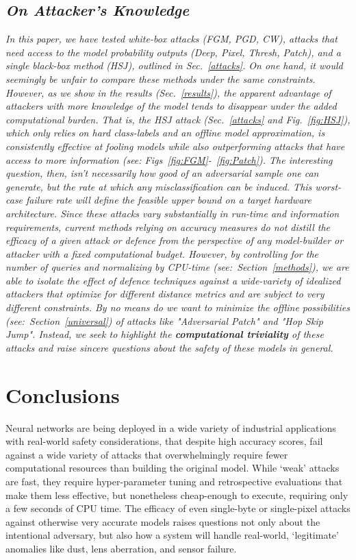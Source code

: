 \documentclass[journal]{IEEEtran}
\newcommand{\cm}[1]{\textit{{\color{blue}#1}}}
\begin{document}
\subsection{\cm{On Attacker's Knowledge}}
\cm{In this paper, we have tested white-box attacks (FGM, PGD, CW), attacks that need access to the model probability outputs (Deep, Pixel, Thresh, Patch), and a single black-box method (HSJ), outlined in Sec.~\ref{attacks}. On one hand, it would seemingly be unfair to compare these methods under the same constraints. However, as we show in the results (Sec.~\ref{results}), the apparent advantage of attackers with more knowledge of the model tends to disappear under the added computational burden. That is, the HSJ attack (Sec.~\ref{attacks} and Fig.~\ref{fig:HSJ}), which only relies on hard class-labels and an offline model approximation, is consistently effective at fooling models while also outperforming attacks that have access to more information (see: Figs~\ref{fig:FGM}-~\ref{fig:Patch}). The interesting question, then, isn't necessarily how good of an adversarial sample one can generate, but \textit{the rate} at which \textit{any} misclassification can be induced. This \textit{worst-case failure rate} will define the feasible upper bound on a target hardware architecture. Since these attacks vary substantially in run-time and information requirements, current methods relying on accuracy measures do not distill the efficacy of a given attack or defence from the perspective of any model-builder or attacker with a fixed computational budget. However, by controlling for the number of queries and normalizing by CPU-time (see:~Section~\ref{methods}), we are able to isolate the effect of defence techniques against a wide-variety of idealized attackers that optimize for different distance metrics and are subject to very different constraints. By no means do we want to minimize the offline possibilities (see:~Section~\ref{universal}) of attacks like "Adversarial Patch" and "Hop Skip Jump". Instead, we seek to highlight the \textbf{computational triviality} of these attacks and raise sincere questions about the safety of these models in general.}

\section{Conclusions}

Neural networks are being deployed in a wide variety of industrial applications with real-world safety considerations, that despite high accuracy scores, fail against a wide variety of attacks that overwhelmingly require fewer computational resources than building the original model. While `weak' attacks are fast, they require hyper-parameter tuning and retrospective evaluations that make them less effective, but nonetheless cheap-enough to execute, requiring only a few seconds of CPU time. The efficacy of even single-byte or single-pixel attacks against otherwise very accurate models raises questions not only about the intentional adversary, but also how a system will handle real-world, `legitimate' anomalies like dust, lens aberration, and sensor failure.
\end{document}
